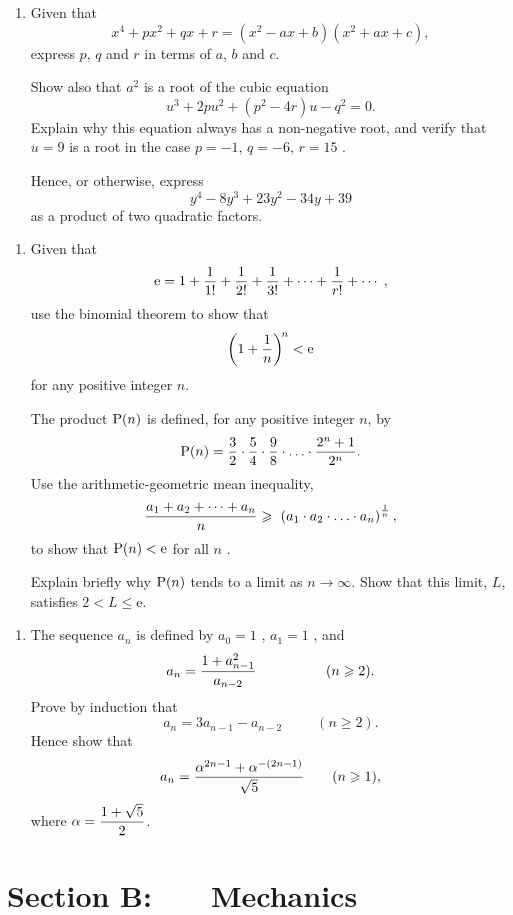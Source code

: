 \documentclass[a4, 11pt]{report}
\newlength{\qspace}
\newcounter{qnumber}
\newenvironment{question}%
 {\vspace{\qspace}
  \begin{enumerate}[\bfseries 1\quad][10]%
    \setcounter{enumi}{\value{qnumber}}%
    \item%
 }
{
  \end{enumerate}
  \filbreak
  \stepcounter{qnumber}
 }
\def\e{{\mathrm e}}
\def\le{\leqslant}
\def\ge{\geqslant}
\begin{document}
\begin{question}
Given that 
\[ 
x^4 + p x^2 + q x + r = ( x^2 - a x + b ) ( x^2 + a x + c ) , 
\]  
express  $p$, $q$ and $r$ in terms of $a$, $b$ and $c$. 
 
Show also that $ a^2$ is a root of the cubic equation 
$$ 
u^3 + 2 p u^2 + ( p^2 - 4 r ) u - q^2 = 0 .  
$$ 
Explain why this equation  always has a non-negative root,  
and verify  that $u = 9$ is a root in the  
case $p = -1$, $q = -6$, $r = 15$ . 
 
Hence, or otherwise, express 
$$y^4 - 8 y^3 + 23 y^2 - 34 y + 39$$ 
as a product of two quadratic factors.  
\end{question}
	
\begin{question}
Given that 
$$\e = 1 + {1 \over 1 !} + {1 \over 2 !} + {1 \over 3 !} + \cdots + {1 \over r !} + \cdots \; ,$$ 
use the binomial theorem to show that 
$$ 
{\left( 1 + {1 \over n} \right)}^{\!n} < \e 
$$  
for any positive integer  $n$. 
 
The product ${\rm P }( n )$  is defined, for any positive integer $n$, by 
$$ 
{\rm P} ( n ) = {3 \over 2} \cdot {5 \over 4}  
\cdot {9 \over 8} \cdot \ldots \cdot {2^n + 1 \over 2^n} . 
$$ 
Use the arithmetic-geometric mean inequality, 
$$ 
{a_1 + a_2 + \cdots + a_n \over n}  
\ge 
 \ {\left( a_1 \cdot a_2 \cdot \ldots \cdot a_n \right)}^{1 \over n}\,, 
$$  
to show that ${\rm P }( n ) < \e$  for all $n$ . 
 
 
Explain briefly why  
 ${\rm P} ( n )$  tends to a limit as $n\to\infty$. 
Show that this limit, $L$, satisfies $2<L\le\e$.
\end{question}
		
\begin{question}	
The sequence $a_n$ is defined by $a_0 = 1$ , $a_1 = 1$ , and 
$$ 
a_n = {1 + a_{n - 1}^2 \over a_{n - 2} } \ \ \ \ \ \ \ \ \ \ \ \ \ \ \ ( n \ge 2 ) . 
$$ 
Prove by induction that 
$$ 
a_n = 3 a_{n - 1} - a_{n - 2} \ \ \ \ \ \ \ \ \ \ \ ( n \ge2 ) . 
$$ 
Hence show that  
$$  
a_n = {\alpha^{2 n - 1} + \alpha^{- ( 2 n - 1 )} \over \sqrt 5} 
\ \ \ \ \ \  (n\ge1), 
$$ 
where $\displaystyle{\alpha = {1 + \sqrt 5 \over 2}}$. 
\end{question}	
		

		
	
\newpage
\section*{Section B: \ \ \ Mechanics}
\end{document}
